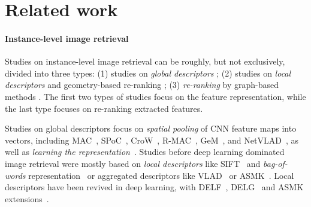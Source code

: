 \section{Related work}
\label{sec:related}

\paragraph{Instance-level image retrieval}

Studies on instance-level image retrieval can be roughly, but not exclusively, divided into three types: (1) studies on \emph{global descriptors} \cite{Babenko01, Gordo01, Kalantidis01, Weyand01, Babenko03, Radenovic01}; (2) studies on \emph{local descriptors} and geometry-based re-ranking \cite{Noh01, Teichmann01, simeoni2019local, Weyand01}; (3) \emph{re-ranking} by graph-based methods \cite{Donoser01, iscen2017efficient, Yang01}.
The first two types of studies focus on the feature representation, while the last type focuses on re-ranking extracted features.

Studies on global descriptors focus on \emph{spatial pooling} of CNN feature maps into vectors, including MAC~\cite{Razavian2015VisualIR}, SPoC~\cite{Babenko03}, CroW~\cite{Kalantidis01}, R-MAC~\cite{ToliasSJ15, Gordo00, Gordo01}, GeM~\cite{Radenovic01}, and NetVLAD~\cite{Arandjelovic01, Kim01}, as well as \emph{learning the representation}~\cite{Babenko01, Gordo00, Gordo01, Radenovi01, Radenovic01}. Studies before deep learning dominated image retrieval were mostly based on \emph{local descriptors} like SIFT~\cite{Lowe01} and \emph{bag-of-words} representation~\cite{Philbin01} or aggregated descriptors like VLAD~\cite{JPD+11} or ASMK~\cite{TAJ13}. Local descriptors have been revived in deep learning, \eg with DELF~\cite{Noh01}, DELG~\cite{ECCV2020_912} and ASMK extensions~\cite{Teichmann01, tolias2020learning}.

